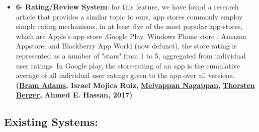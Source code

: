 \documentclass{article}
\begin{document}
\begin{itemize}
        \item \textbf{6- }\textbf{Rating/Review System}: for this feature, we have found a research article that provides a similar topic to ours, app stores commonly employ simple rating mechanisms, in at least five of the most popular app-stores, which are Apple's app store ,Google Play, Windows Phone store , Amazon Appstore, and Blackberry App World (now defunct), the store rating is represented as a number of "stars" from 1 to 5, aggregated from individual user ratings. In Google play, the store-rating of an app is the cumulative average of all individual user ratings given to the app over all versions. \textbf{(}\href{https://www.researchgate.net/profile/Bram-Adams?_tp=eyJjb250ZXh0Ijp7ImZpcnN0UGFnZSI6InB1YmxpY2F0aW9uIiwicGFnZSI6InB1YmxpY2F0aW9uIn19}{\textbf{Bram Adams}}\textbf{, Israel Mojica Ruiz, }\href{https://www.researchgate.net/scientific-contributions/Meiyappan-Nagappan-65898809?_tp=eyJjb250ZXh0Ijp7ImZpcnN0UGFnZSI6InB1YmxpY2F0aW9uIiwicGFnZSI6InB1YmxpY2F0aW9uIn19}{\textbf{Meiyappan Nagappan}}\textbf{, }\href{https://www.researchgate.net/scientific-contributions/Thorsten-Berger-2005390073?_tp=eyJjb250ZXh0Ijp7ImZpcnN0UGFnZSI6InB1YmxpY2F0aW9uIiwicGFnZSI6InB1YmxpY2F0aW9uIn19}{\textbf{Thorsten Berger}}\textbf{,} \textbf{Ahmed E. Hassan, 2017)}  
      \end{itemize}\pagebreak
      \subsection{Existing Systems:}
\end{document}
